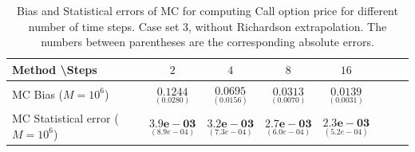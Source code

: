 \documentclass[11pt]{article}
\begin{document}
\begin{table}[h!]
	\centering
	\begin{tabular}{l*{6}{c}r}
		Method \textbackslash  Steps            & $2$ & $4$ & $8$ & $16$  \\
		\hline
		MC Bias ($M=10^6$)   & 	$ \underset{(  0.0280)}{\mathbf{0.1244}}$  & $\underset{(  0.0156
			)}{\mathbf{0.0695}}$  & $\underset{(0.0070
			)}{\mathbf{0.0313}}$ & $\underset{( 0.0031
			)}{\mathbf{0.0139}}$\\ 
		
		MC Statistical error ($M=10^6$)  &  $\underset{(8.9e-04)} {\mathbf{3.9e-03}}$  & $\underset{( 7.3e-04)} {\mathbf{3.2e-03}}$  & $\underset{(  6.0e-04)} {\mathbf{ 2.7e-03}}$ & $\underset{(5.2e-04)} {\mathbf{2.3e-03}}$	\\
		\hline
	\end{tabular}
	\caption{Bias and Statistical errors of MC  for computing Call option price  for different number of time steps. Case set 3, without Richardson extrapolation. The numbers between parentheses are the corresponding absolute errors.}
	\label{Bias and Statistical errors of MC ($M=10^6$)  for computing Call option price  for different number of time steps. Case set 3, without Richardson extrapolation. The numbers between parentheses are the corresponding absolute errors.}
\end{table}
\end{document}
